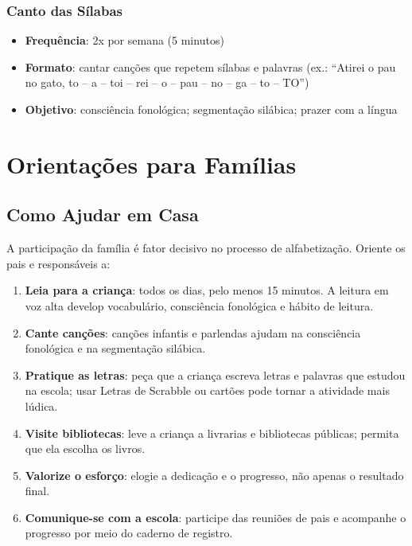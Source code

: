 \subsection{Canto das S\'{i}labas}
\begin{itemize}[leftmargin=2cm]
  \item \textbf{Frequ\^{e}ncia}: 2x por semana (5 minutos)
  \item \textbf{Formato}: cantar canções que repetem s\'{i}labas e palavras
  (ex.: ``Atirei o pau no gato, to -- a -- toi -- rei -- o -- pau -- no
  -- ga -- to -- TO'')
  \item \textbf{Objetivo}: consci\^{e}ncia fonol\'{o}gica; segmenta\c{c}\~{a}o
  sil\'{a}bica; prazer com a l\'{i}ngua
\end{itemize}


\chapter{Orienta\c{c}\~{o}es para Fam\'{i}lias}

\section{Como Ajudar em Casa}

A participa\c{c}\~{a}o da fam\'{i}lia \'{e} fator decisivo no processo
de alfabetiza\c{c}\~{a}o. Oriente os pais e respons\'{a}veis a:

\begin{enumerate}[leftmargin=2cm]
  \item \textbf{Leia para a crian\c{c}a}: todos os dias, pelo menos
  15 minutos. A leitura em voz alta develop vocabul\'{a}rio, consci\^{e}ncia
  fonol\'{o}gica e h\'{a}bito de leitura.

  \item \textbf{Cante can\c{c}\~{o}es}: can\c{c}\~{o}es infantis e
  parlendas ajudam na consci\^{e}ncia fonol\'{o}gica e na
  segmenta\c{c}\~{a}o sil\'{a}bica.

  \item \textbf{Pratique as letras}: peça que a crian\c{c}a escreva
  letras e palavras que estudou na escola; usar Letras de Scrabble
  ou cart\~{o}es pode tornar a atividade mais l\'{u}dica.

  \item \textbf{Visite bibliotecas}: leve a crian\c{c}a a livrarias
  e bibliotecas p\'{u}blicas; permita que ela escolha os livros.

  \item \textbf{Valorize o esfor\c{c}o}: elogie a dedica\c{c}\~{a}o
  e o progresso, n\~{a}o apenas o resultado final.

  \item \textbf{Comunique-se com a escola}: participe das reuni\~{o}es
  de pais e acompanhe o progresso por meio do caderno de registro.
\end{enumerate}

